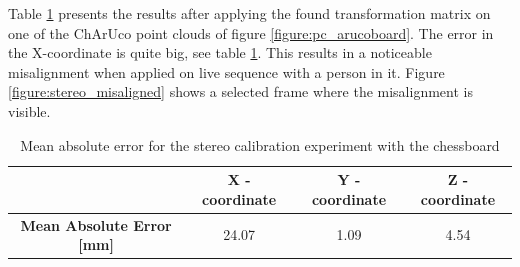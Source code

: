 
Table \ref{tab:mae_chessboard} presents the results after applying the found transformation matrix on one of the ChArUco point clouds of figure \ref{figure:pc_arucoboard}. The error in the X-coordinate is quite big, see table \ref{tab:mae_chessboard}. This results in a noticeable misalignment when applied on live sequence with a person in it. Figure \ref{figure:stereo_misaligned} shows a selected frame where the misalignment is visible.

\begin{table}[H]
\centering
\begin{tabular}{c|c|c|c}
 & \textbf{X - coordinate} & \textbf{Y - coordinate} & \textbf{Z - coordinate} \\ \hline
\textbf{Mean Absolute Error {[}mm{]}} & 24.07 & 1.09 & 4.54
\end{tabular}
\caption{Mean absolute error for the stereo calibration experiment with the chessboard}
\label{tab:mae_chessboard}
\end{table}

